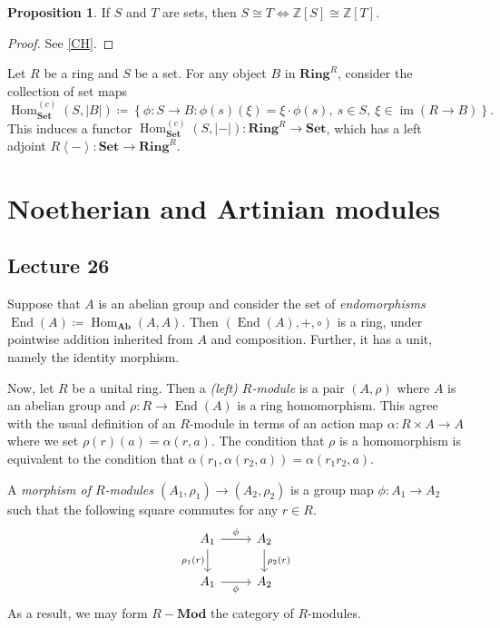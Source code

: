 \documentclass[10pt,letterpaper,cm]{nupset}
\theoremstyle{definition}
\theoremstyle{theorem}
\newtheorem{prop}[definition]{Proposition}
\theoremstyle{remark}
\newcommand{\Z}{\mathbb Z}
\newcommand{\1}{\mathbf{1}}
\newcommand{\0}{\vec 0}
\DeclareMathOperator{\ed}{End}
\DeclareMathOperator{\Hom}{Hom}
\begin{document}
\medskip

\begin{prop}
If $S$ and $T$ are sets, then $S\cong T \iff \Z\left[S\right]\cong \Z\left[T\right]$.
\end{prop}
\begin{proof}
See \cref{CH}.
\end{proof}

\bigskip

Let $R$ be a ring and $S$ be a set. For any object $B$ in $\mathbf{Ring}^R$, consider the collection of set maps
\[
\operatorname{Hom}_{\mathbf{Set}}^{(c)}(S,\left\lvert{B}\right\rvert)\coloneqq \left\{\phi: S \rightarrow B: \phi(s)(\xi)=\xi \cdot \phi(s), \ s \in S, \ \xi \in \operatorname{im}(R \rightarrow B)\right\}. 
\]
This induces a functor $\operatorname{Hom}_{\mathbf{Set}}^{(c)}(S,\left\lvert{-}\right\rvert) : \mathbf{Ring}^R \to \mathbf{Set}$, which has a left adjoint $R\left\langle{-}\right\rangle : \mathbf{Set} \to \mathbf{Ring}^R$.


\section{Noetherian and Artinian modules}

\subsection{Lecture 26}


Suppose that $A$ is an abelian group and consider the set of \textit{endomorphisms} $\ed(A) \coloneqq \Hom_{\mathbf{Ab}}(A, A)$. Then $\left(\ed(A), +, \circ\right)$ is a ring, under pointwise addition inherited from $A$ and composition. Further, it has a unit, namely the identity morphism. 

 Now,
let $R$ be a unital ring. Then a \textit{(left) $R$-module} is a pair $\left(A, \rho\right)$ where $A$ is an abelian group and $\rho : R \to \ed(A)$ is a ring homomorphism.
This agree with the usual definition of an $R$-module in terms of an action map $\alpha : R\times A \to A$ where we set $\rho(r)(a) = \alpha(r, a)$. The condition that $\rho$ is a homomorphism is equivalent to the condition that $\alpha\left(r_{1}, \alpha\left(r_{2}, a\right)\right)=\alpha\left(r_{1} r_{2}, a\right)$. 

A \textit{morphism of $R$-modules $\left(A_1, \rho_1\right) \to \left(A_2, \rho_2\right)$} is a group map $\phi : A_1 \to A_2$ such that the following square commutes for any $r\in R$.
\[
\begin{tikzcd}
A_1 \arrow[d, "\rho_1(r)"'] \arrow[r, "\phi"] & A_2 \arrow[d, "\rho_2(r)"] \\
A_1 \arrow[r, "\phi"'] & A_2
\end{tikzcd}
\] 
As a result, we may form $R{-}\mathbf{Mod}$ the category of $R$-modules.
\end{document}
